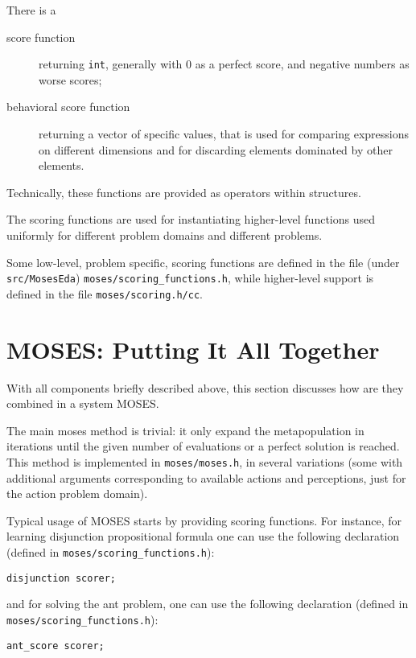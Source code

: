 \documentclass{article}
\begin{document}
There is a 
\begin{description}
\item[score function] returning \verb|int|, generally with
0 as a perfect score, and negative numbers as worse scores;
\item[behavioral score function] returning a vector of specific 
values, that is used for comparing expressions on different 
dimensions and for discarding elements dominated by other elements.
\end{description}

Technically, these functions are provided as operators within 
structures. 

The scoring functions are used for instantiating higher-level
functions used uniformly for different problem domains and different
problems. 

Some low-level, problem specific, scoring functions are defined in 
the file (under \verb|src/MosesEda|) \verb|moses/scoring_functions.h|,
while higher-level support is defined in the file \verb|moses/scoring.h/cc|.

\section{MOSES: Putting It All Together}

With all components briefly described above, this section discusses
how are they combined in a system MOSES. 

The main moses method is trivial: it only expand the metapopulation 
in iterations until the given number of evaluations or a perfect
solution is reached. This method is implemented in \verb|moses/moses.h|,
in several variations (some with additional arguments corresponding to
available actions and perceptions, just for the action problem domain). 

Typical usage of MOSES starts by providing scoring functions. For 
instance, for learning disjunction propositional formula one can 
use the following declaration (defined in \verb|moses/scoring_functions.h|):

\begin{verbatim}
disjunction scorer;
\end{verbatim}

\noindent 
and for solving the ant problem, one can use the following declaration 
(defined in \verb|moses/scoring_functions.h|):

\begin{verbatim}
ant_score scorer;
\end{verbatim}
\end{document}
